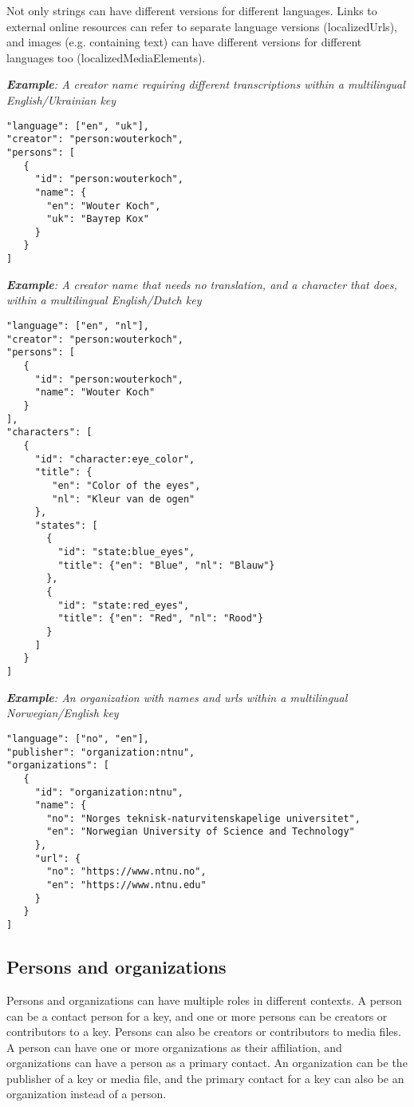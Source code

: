 \documentclass[10pt,letterpaper]{article}
\begin{document}
Not only strings can have different versions for different languages. Links to external online resources can refer to separate language versions (localizedUrls), and images (e.g. containing text) can have different versions for different languages too (localizedMediaElements).

\textit{\textbf{Example}: A creator name requiring different transcriptions within a multilingual English/Ukrainian key}
\begin{verbatim}
"language": ["en", "uk"],
"creator": "person:wouterkoch",
"persons": [
   {
     "id": "person:wouterkoch",
     "name": {
       "en": "Wouter Koch",
       "uk": "Ваутер Кох"
     }
   }
]

\end{verbatim}

\textit{\textbf{Example}: A creator name that needs no translation, and a character that does, within a multilingual English/Dutch key}
\begin{verbatim}
"language": ["en", "nl"],
"creator": "person:wouterkoch",
"persons": [
   {
     "id": "person:wouterkoch",
     "name": "Wouter Koch"
   }
],
"characters": [
   {
     "id": "character:eye_color",
     "title": {
        "en": "Color of the eyes",
        "nl": "Kleur van de ogen"
     },
     "states": [
       {
         "id": "state:blue_eyes",
         "title": {"en": "Blue", "nl": "Blauw"}
       },
       {
         "id": "state:red_eyes",
         "title": {"en": "Red", "nl": "Rood"}
       }
     ]
   }
]

\end{verbatim}

\textit{\textbf{Example}: An organization with names and urls within a multilingual Norwegian/English key}
\begin{verbatim}
"language": ["no", "en"],
"publisher": "organization:ntnu",
"organizations": [
   {
     "id": "organization:ntnu",
     "name": {
       "no": "Norges teknisk-naturvitenskapelige universitet",
       "en": "Norwegian University of Science and Technology"
     },
     "url": {
       "no": "https://www.ntnu.no",
       "en": "https://www.ntnu.edu"
     }
   }
]

\end{verbatim}
\subsection*{
Persons and organizations
}
Persons and organizations can have multiple roles in different contexts. A person can be a contact person for a key, and one or more persons can be creators or contributors to a key. Persons can also be creators or contributors to media files. A person can have one or more organizations as their affiliation, and organizations can have a person as a primary contact. An organization can be the publisher of a key or media file, and the primary contact for a key can also be an organization instead of a person.
\end{document}
